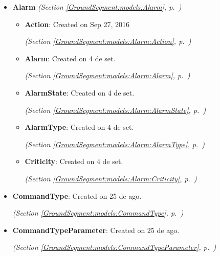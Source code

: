 \begin{itemize}
\setlength{\parskip}{0ex}
\item \textbf{Alarm}
  \textit{(Section \ref{GroundSegment:models:Alarm}, p.~\pageref{GroundSegment:models:Alarm})}

  \begin{itemize}
\setlength{\parskip}{0ex}
    \item \textbf{Action}: Created on Sep 27, 2016



  \textit{(Section \ref{GroundSegment:models:Alarm:Action}, p.~\pageref{GroundSegment:models:Alarm:Action})}

    \item \textbf{Alarm}: Created on 4 de set.



  \textit{(Section \ref{GroundSegment:models:Alarm:Alarm}, p.~\pageref{GroundSegment:models:Alarm:Alarm})}

    \item \textbf{AlarmState}: Created on 4 de set.



  \textit{(Section \ref{GroundSegment:models:Alarm:AlarmState}, p.~\pageref{GroundSegment:models:Alarm:AlarmState})}

    \item \textbf{AlarmType}: Created on 4 de set.



  \textit{(Section \ref{GroundSegment:models:Alarm:AlarmType}, p.~\pageref{GroundSegment:models:Alarm:AlarmType})}

    \item \textbf{Criticity}: Created on 4 de set.



  \textit{(Section \ref{GroundSegment:models:Alarm:Criticity}, p.~\pageref{GroundSegment:models:Alarm:Criticity})}

  \end{itemize}
\item \textbf{CommandType}: Created on 25 de ago.



  \textit{(Section \ref{GroundSegment:models:CommandType}, p.~\pageref{GroundSegment:models:CommandType})}

\item \textbf{CommandTypeParameter}: Created on 25 de ago.



  \textit{(Section \ref{GroundSegment:models:CommandTypeParameter}, p.~\pageref{GroundSegment:models:CommandTypeParameter})}


\end{itemize}
